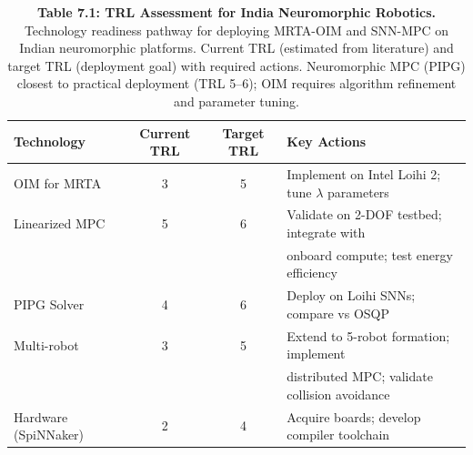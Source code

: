 \begin{table}[H]
\centering
\caption{\textbf{Table 7.1: TRL Assessment for India Neuromorphic Robotics.} Technology readiness pathway for deploying MRTA-OIM and SNN-MPC on Indian neuromorphic platforms. Current TRL (estimated from literature) and target TRL (deployment goal) with required actions. Neuromorphic MPC (PIPG) closest to practical deployment (TRL 5–6); OIM requires algorithm refinement and parameter tuning.}
\label{tab:7-1}
\small
\begin{tabular}{lccl}
\toprule
\textbf{Technology} & \textbf{Current TRL} & \textbf{Target TRL} & \textbf{Key Actions} \\
\midrule
\rowcolor{gray!15}
OIM for MRTA & 3 & 5 & Implement on Intel Loihi 2; tune $\lambda$ parameters \\
Linearized MPC & 5 & 6 & Validate on 2-DOF testbed; integrate with \\
 &  &  & onboard compute; test energy efficiency \\
\rowcolor{gray!15}
PIPG Solver & 4 & 6 & Deploy on Loihi SNNs; compare vs OSQP \\
Multi-robot & 3 & 5 & Extend to 5-robot formation; implement \\
 &  &  & distributed MPC; validate collision avoidance \\
\rowcolor{gray!15}
Hardware (SpiNNaker) & 2 & 4 & Acquire boards; develop compiler toolchain \\
\bottomrule
\end{tabular}
\end{table}
